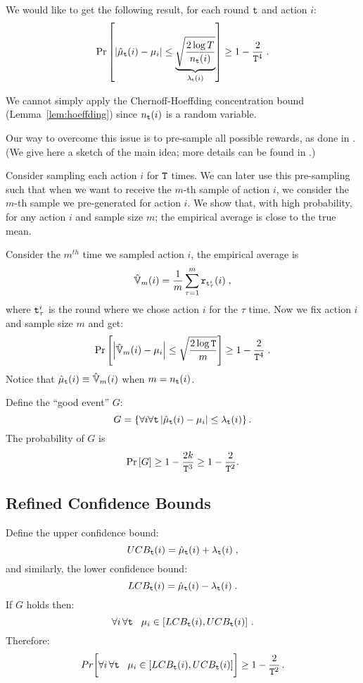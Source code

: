 We would like to get the following result, for each round ${\tt t}$ and action $i$:
\[
\Pr\left[\left|\hat{\mu}_{{\tt t}}(i)-\mu_{i}\right|\le\underbrace{\sqrt{\frac{2\log
T}{n_{{\tt t}}(i)}}}_{\lambda_{{\tt t}}(i)}\right]\ge1-\frac{2}{{\tt T}^{4}}\;.
\]

We cannot simply apply the Chernoff-Hoeffding concentration bound (Lemma~\ref{lem:hoeffding}) since $n_{\tt t}(i)$ is a random variable.

Our way to overcome this issue is to pre-sample all possible rewards, as done in \cite{Slivkins-book-19}. (We give here a sketch of the main idea; more details can be found in \cite{Slivkins-book-19}.)

Consider sampling each action $i$ for ${\tt T}$ times. We can later use this pre-sampling such that when we want to receive the $m$-th sample of action $i$, we consider the $m$-th sample we pre-generated for action $i$. We show that, with high probability, for any action $i$ and sample size $m$; the empirical average is close to the true mean.

Consider the $m^{th}$ time we sampled action $i$, the empirical average is 
\[
\hat{\mathbb{V}}_{m}(i)=\frac{1}{m} \sum_{\tau=1}^{m}{\tt r}_{{\tt t}_{\tau}^i}(i)\;,
\]
where ${\tt t}_{\tau}^i$ is the round where we chose action $i$ for the $\tau$ time.
%
Now we fix action $i$ and sample size $m$ and get:
\[
\Pr\left[\left|\hat{\mathbb{V}}_{m}(i)-\mu_{i}\right|\le\sqrt{\frac{2\log
{\tt T}}{m}}\right]\ge1-\frac{2}{{\tt T}^{4}}\;.
\]
Notice that $\hat{\mu}_{{\tt t}}(i)\equiv\hat{\mathbb{V}}_{m}(i)$ when
$m=n_{{\tt t}}(i)$.

Define the ``good event'' $G$:
\[
G=\left\{ \forall {i}\forall {{\tt t}}\left|\hat{\mu}_{{\tt t}}(i)-\mu_{i}\right|\le\lambda_{{\tt t}}(i)\right\}.
\]
The probability of $G$ is
\[
\Pr\left[G\right]\ge 1-\frac{2k}{{\tt T}^{3}}\ge 1-\frac{2}{{\tt T}^{2}}.
\]



\subsection{Refined Confidence Bounds}

Define the upper confidence bound:
\[
UCB_{{\tt t}}(i)=\hat{\mu}_{{\tt t}}(i)+\lambda_{{\tt t}}(i)\;,
\]
and similarly, the lower confidence bound:
\[
LCB_{{\tt t}}(i)=\hat{\mu}_{{\tt t}}(i)-\lambda_{{\tt t}}(i)\;.
\]
If $G$ holds then:
\[
\forall{i}\,\forall{{\tt t}}\;\;\;\mu_{i}\in\left[LCB_{{\tt t}}(i),UCB_{{\tt t}}(i)\right]\, .
\]
Therefore:
\[
Pr\biggl[\forall{i}\,\forall{{\tt t}}\;\;\;
\mu_{i}\in\left[LCB_{{\tt t}}(i),UCB_{{\tt t}}(i)\right]\biggr]\ge1-\frac{2}{{\tt T}^{2}}\,.
\]

